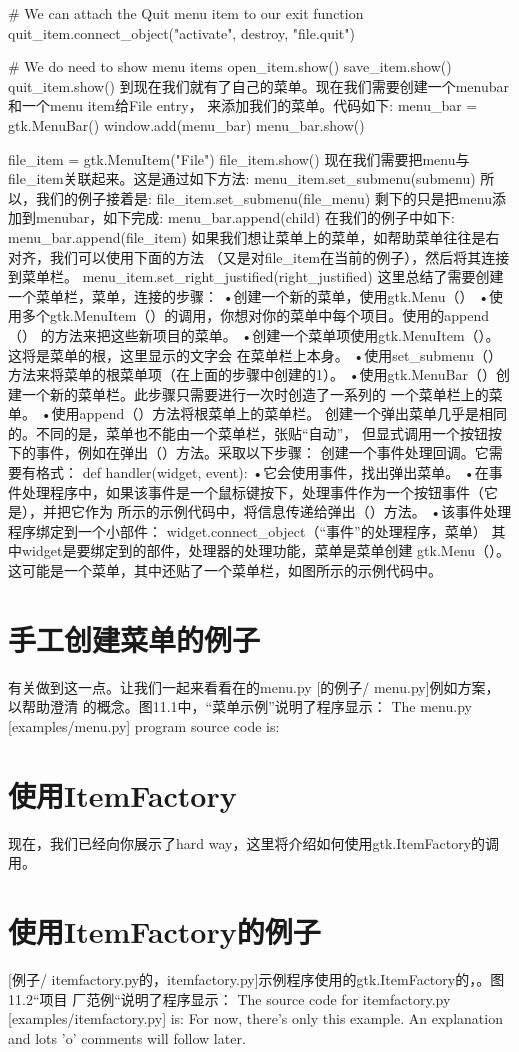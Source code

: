 # We can attach the Quit menu item to our exit function
quit_item.connect_object("activate", destroy, "file.quit")

# We do need to show menu items
open_item.show()
save_item.show()
quit_item.show()
到现在我们就有了自己的菜单。现在我们需要创建一个menubar和一个menu item给File entry， 来添加我们的菜单。代码如下:
menu_bar = gtk.MenuBar()
window.add(menu_bar)
menu_bar.show()

file_item = gtk.MenuItem("File")
file_item.show()
现在我们需要把menu与file_item关联起来。这是通过如下方法:
menu_item.set_submenu(submenu)
所以，我们的例子接着是:
file_item.set_submenu(file_menu)
剩下的只是把menu添加到menubar，如下完成:
menu_bar.append(child)
在我们的例子中如下:
menu_bar.append(file_item)
如果我们想让菜单上的菜单，如帮助菜单往往是右对齐，我们可以使用下面的方法
（又是对file_item在当前的例子），然后将其连接到菜单栏。
menu_item.set_right_justified(right_justified)
这里总结了需要创建一个菜单栏，菜单，连接的步骤：
•创建一个新的菜单，使用gtk.Menu（）
•使用多个gtk.MenuItem（）的调用，你想对你的菜单中每个项目。使用的append（）
的方法来把这些新项目的菜单。
•创建一个菜单项使用gtk.MenuItem（）。这将是菜单的根，这里显示的文字会
在菜单栏上本身。
•使用set_submenu（）方法来将菜单的根菜单项（在上面的步骤中创建的1）。
•使用gtk.MenuBar（）创建一个新的菜单栏。此步骤只需要进行一次时创造了一系列的
一个菜单栏上的菜单。
•使用append（）方法将根菜单上的菜单栏。
创建一个弹出菜单几乎是相同的。不同的是，菜单也不能由一个菜单栏，张贴“自动”，
但显式调用一个按钮按下的事件，例如在弹出（）方法。采取以下步骤：
创建一个事件处理回调。它需要有格式：
def handler(widget, event):
•它会使用事件，找出弹出菜单。
•在事件处理程序中，如果该事件是一个鼠标键按下，处理事件作为一个按钮事件（它是），并把它作为
所示的示例代码中，将信息传递给弹出（）方法。
•该事件处理程序绑定到一个小部件：
widget.connect_object（“事件”的处理程序，菜单）
其中widget是要绑定到的部件，处理器的处理功能，菜单是菜单创建
gtk.Menu（）。这可能是一个菜单，其中还贴了一个菜单栏，如图所示的示例代码中。
\section{手工创建菜单的例子} %
有关做到这一点。让我们一起来看看在的menu.py [的例子/ menu.py]例如方案，以帮助澄清
的概念。图11.1中，“菜单示例”说明了程序显示：
The menu.py [examples/menu.py] program source code is:

\section{使用ItemFactory}
现在，我们已经向你展示了hard way，这里将介绍如何使用gtk.ItemFactory的调用。
\section{使用ItemFactory的例子}
[例子/ itemfactory.py的，itemfactory.py]示例程序使用的gtk.ItemFactory的，。图11.2“项目
厂范例“说明了程序显示：
The source code for itemfactory.py [examples/itemfactory.py] is:
For now, there’s only this example. An explanation and lots ’o’ comments will follow later.

